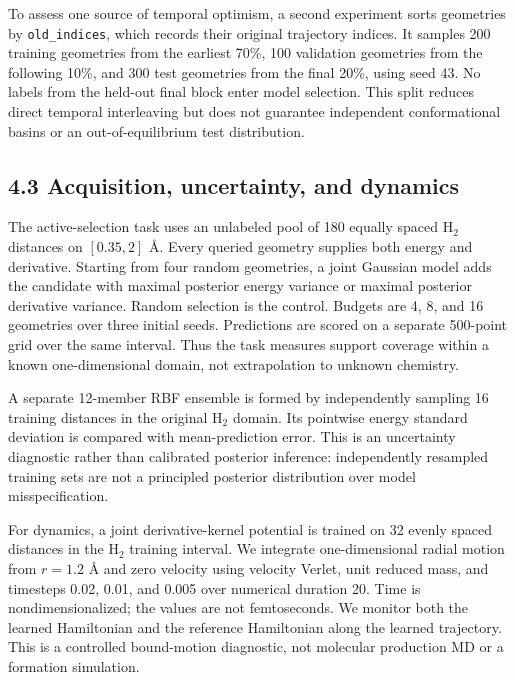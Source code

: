 \documentclass[
  11pt,
  a4paper,
]{article}
\begin{document}
To assess one source of temporal optimism, a second experiment sorts
geometries by \texttt{old\_indices}, which records their original
trajectory indices. It samples 200 training geometries from the earliest
70\%, 100 validation geometries from the following 10\%, and 300 test
geometries from the final 20\%, using seed 43. No labels from the
held-out final block enter model selection. This split reduces direct
temporal interleaving but does not guarantee independent conformational
basins or an out-of-equilibrium test distribution.

\hypertarget{acquisition-uncertainty-and-dynamics}{%
\subsection{4.3 Acquisition, uncertainty, and
dynamics}\label{acquisition-uncertainty-and-dynamics}}

The active-selection task uses an unlabeled pool of 180 equally spaced
H\(_2\) distances on \([0.35,2]\) Å. Every queried geometry supplies
both energy and derivative. Starting from four random geometries, a
joint Gaussian model adds the candidate with maximal posterior energy
variance or maximal posterior derivative variance. Random selection is
the control. Budgets are 4, 8, and 16 geometries over three initial
seeds. Predictions are scored on a separate 500-point grid over the same
interval. Thus the task measures support coverage within a known
one-dimensional domain, not extrapolation to unknown chemistry.

A separate 12-member RBF ensemble is formed by independently sampling 16
training distances in the original H\(_2\) domain. Its pointwise energy
standard deviation is compared with mean-prediction error. This is an
uncertainty diagnostic rather than calibrated posterior inference:
independently resampled training sets are not a principled posterior
distribution over model misspecification.

For dynamics, a joint derivative-kernel potential is trained on 32
evenly spaced distances in the H\(_2\) training interval. We integrate
one-dimensional radial motion from \(r=1.2\) Å and zero velocity using
velocity Verlet, unit reduced mass, and timesteps 0.02, 0.01, and 0.005
over numerical duration 20. Time is nondimensionalized; the values are
not femtoseconds. We monitor both the learned Hamiltonian and the
reference Hamiltonian along the learned trajectory. This is a controlled
bound-motion diagnostic, not molecular production MD or a formation
simulation.
\end{document}
